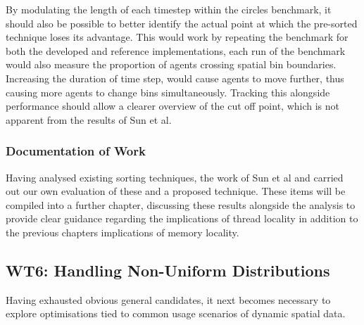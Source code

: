         By modulating the length of each timestep within the circles benchmark, it should also be possible to better identify the actual point at which the pre-sorted technique loses its advantage. This would work by repeating the benchmark for both the developed and reference implementations, each run of the benchmark would also measure the proportion of agents crossing spatial bin boundaries. Increasing the duration of time step, would cause agents to move further, thus causing more agents to change bins simultaneously. Tracking this alongside performance should allow a clearer overview of the cut off point, which is not apparent from the results of Sun et al.
      
      \subsubsection*{Documentation of Work}
        Having analysed existing sorting techniques, the work of Sun et al and carried out our own evaluation of these and a proposed technique. These items will be compiled into a further chapter, discussing these results alongside the analysis to provide clear guidance regarding the implications of thread locality in addition to the previous chapters implications of memory locality.
     
      
    
    \subsection{WT6: Handling Non-Uniform Distributions}
      Having exhausted obvious general candidates, it next becomes necessary to explore optimisations tied to common usage scenarios of dynamic spatial data.
      
